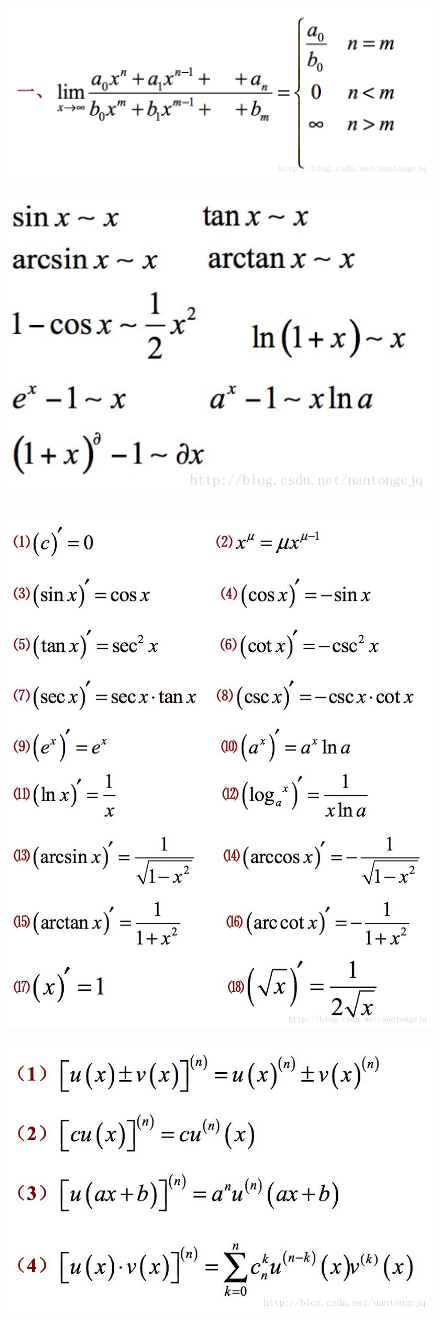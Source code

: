 \documentclass[a4paper,11pt]{article}
\begin{document}
\begin{CJK}{UTF8}{gbsn}
    \begin{figure}[!htb]
      \begin{center}
        \includegraphics[width=0.50\linewidth]{../scoure/1.png}
      \end{center}
    \end{figure}
    \begin{figure}[!htb]
      \begin{center}
        \includegraphics[width=0.30\linewidth]{../scoure/3.png}
      \end{center}
    \end{figure}
    \begin{figure}[!htb]
      \begin{center}
        \includegraphics[width=0.50\linewidth]{../scoure/5.png}
      \end{center}
    \end{figure}
    \begin{figure}[!htb]
      \begin{center}
        \includegraphics[width=0.50\linewidth]{../scoure/6.png}

\end{center}
\end{figure}
\end{CJK}
\end{document}
